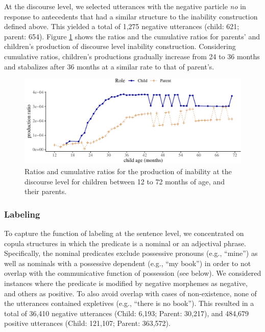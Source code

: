 \documentclass[
  english,
  man,floatsintext]{apa6}
\begin{document}
At the discourse level, we selected utterances with the negative particle \emph{no} in response to antecedents that had a similar structure to the inability construction defined above. This yielded a total of 1,275 negative utterances (child: 621; parent: 654). Figure \ref{fig:inabilitydiscourse} shows the ratios and the cumulative ratios for parents' and children's production of discourse level inability construction. Considering cumulative ratios, children's productions gradually increase from 24 to 36 months and stabalizes after 36 months at a similar rate to that of parent's.

\begin{figure}[H]

{\centering \includegraphics{neg_construction_article_files/figure-latex/inabilitydiscourse-1} 

}

\caption{Ratios and cumulative ratios for the production of inability at the discourse level for children between 12 to 72 months of age, and their parents.}\label{fig:inabilitydiscourse}
\end{figure}

\hypertarget{labeling}{%
\subsubsection{Labeling}\label{labeling}}

To capture the function of labeling at the sentence level, we concentrated on copula structures in which the predicate is a nominal or an adjectival phrase. Specifically, the nominal predicates exclude possessive pronouns (e.g., ``mine'') as well as nominals with a possessive dependent (e.g., ``my book'') in order to not overlap with the communicative function of possession (see below). We considered instances where the predicate is modified by negative morphemes as negative, and others as positive. To also avoid overlap with cases of non-existence, none of the utterances contained expletives (e.g., ``there is no book''). This resulted in a total of 36,410 negative utterances (Child: 6,193; Parent: 30,217), and 484,679 positive utterances (Child: 121,107; Parent: 363,572).
\end{document}
